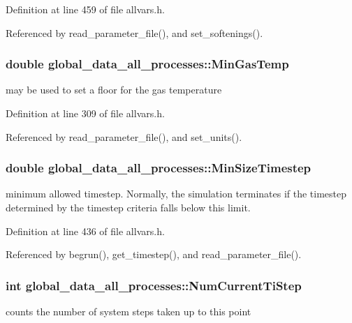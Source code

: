 Definition at line 459 of file allvars.h.



Referenced by read\_\-parameter\_\-file(), and set\_\-softenings().

\hypertarget{structglobal__data__all__processes_a728a84084280f547b1b68dbb143570ad}{
\subsubsection[{MinGasTemp}]{\setlength{\rightskip}{0pt plus 5cm}double {\bf global\_\-data\_\-all\_\-processes::MinGasTemp}}}
\label{structglobal__data__all__processes_a728a84084280f547b1b68dbb143570ad}
may be used to set a floor for the gas temperature 

Definition at line 309 of file allvars.h.



Referenced by read\_\-parameter\_\-file(), and set\_\-units().

\hypertarget{structglobal__data__all__processes_ab5f56d94a4417c5a703b6d2d4cb81a05}{
\subsubsection[{MinSizeTimestep}]{\setlength{\rightskip}{0pt plus 5cm}double {\bf global\_\-data\_\-all\_\-processes::MinSizeTimestep}}}
\label{structglobal__data__all__processes_ab5f56d94a4417c5a703b6d2d4cb81a05}
minimum allowed timestep. Normally, the simulation terminates if the timestep determined by the timestep criteria falls below this limit. 

Definition at line 436 of file allvars.h.



Referenced by begrun(), get\_\-timestep(), and read\_\-parameter\_\-file().

\hypertarget{structglobal__data__all__processes_a35de8a7666698b80478bfedf4362e844}{
\subsubsection[{NumCurrentTiStep}]{\setlength{\rightskip}{0pt plus 5cm}int {\bf global\_\-data\_\-all\_\-processes::NumCurrentTiStep}}}
\label{structglobal__data__all__processes_a35de8a7666698b80478bfedf4362e844}
counts the number of system steps taken up to this point 

